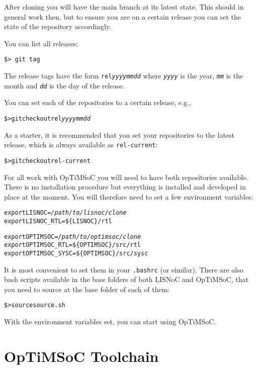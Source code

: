 After cloning you will have the main branch at its latest state. This
should in general work then, but to ensure you are on a certain
release you can set the state of the repository accordingly.

You can list all releases:

\begin{verbatim}
$> git tag
\end{verbatim}

The release tags have the form \texttt{rel\emph{yyyymmdd}} where
\texttt{\emph{yyyy}} is the year, \texttt{\emph{mm}} is the month and
\texttt{\emph{dd}} is the day of the release.

You can set each of the repositories to a certain release, e.g.,

\begin{alltt}
\$> git checkout rel\emph{yyyymmdd}
\end{alltt}

As a starter, it is recommended that you set your repositories to the
latest release, which is always available as \texttt{rel-current}:

\begin{alltt}
\$> git checkout rel-current
\end{alltt}

For all work with OpTiMSoC you will need to have both repositories
available. There is no installation procedure but everything is
installed and developed in place at the moment. You will therefore
need to set a few environment variables:

\begin{alltt}
export LISNOC=\emph{/path/to/lisnoc/clone}
export LISNOC_RTL=\$\{LISNOC\}/rtl

export OPTIMSOC=\emph{/path/to/optimsoc/clone}
export OPTIMSOC_RTL=\$\{OPTIMSOC\}/src/rtl
export OPTIMSOC_SYSC=\$\{OPTIMSOC\}/src/sysc
\end{alltt}

It is most convenient to set them in your \verb|.bashrc| (or similar).
There are also bash scripts available in the base folders of both
LISNoC and OpTiMSoC, that you need to source at the base folder of
each of them:

\begin{alltt}
\$> source source.sh
\end{alltt}

With the environment variables set, you can start using OpTiMSoC.

\section{OpTiMSoC Toolchain}


